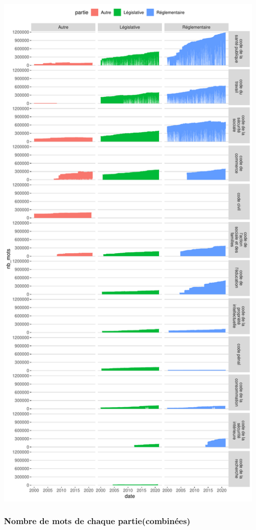 \documentclass[
  oneside]{book}
\begin{document}
\includegraphics{05-images_files/figure-latex/lr.all-1.pdf}

\hypertarget{nombre-de-mots-de-chaque-partiecombinuxe9es}{%
\subsubsection{Nombre de mots de chaque partie(combinées)}\label{nombre-de-mots-de-chaque-partiecombinuxe9es}}
\end{document}

